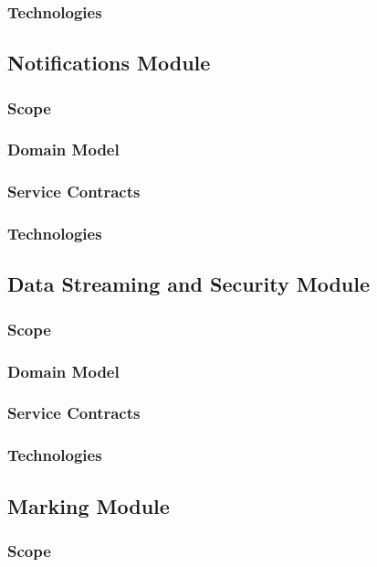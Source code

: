 \documentclass{article}
\begin{document}
		\subsubsection{Technologies}
		
	\subsection{Notifications Module}
		\subsubsection{Scope}
		\subsubsection{Domain Model}
		\subsubsection{Service Contracts}
		\subsubsection{Technologies}
		
	\subsection{Data Streaming and Security Module}
		\subsubsection{Scope}
		\subsubsection{Domain Model}
		\subsubsection{Service Contracts}
		\subsubsection{Technologies}

	\subsection{Marking Module}
		\subsubsection{Scope}
\end{document}
